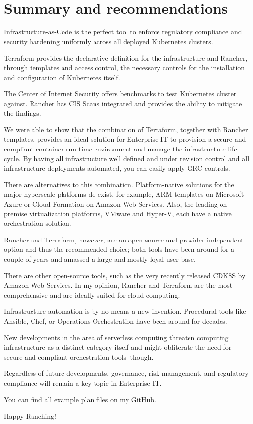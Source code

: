 %
%

\pagebreak
\section{Summary and recommendations}

\onehalfspacing

Infrastructure-as-Code is the perfect tool to enforce regulatory compliance and security hardening uniformly across all deployed Kubernetes clusters.

Terraform provides the declarative definition for the infrastructure and Rancher, through templates and access control, the necessary controls for the installation and configuration of Kubernetes itself.

The Center of Internet Security offers benchmarks to test Kubernetes cluster against. Rancher has CIS Scans integrated and provides the ability to mitigate the findings.

We were able to show that the combination of Terraform, together with Rancher templates, provides an ideal solution for Enterprise IT to provision a secure and compliant container run-time environment and manage the infrastructure life cycle. By having all infrastructure well defined and under revision control and all infrastructure deployments automated, you can easily apply GRC controls. 

There are alternatives to this combination. Platform-native solutions for the major hyperscale platforms do exist, for example, ARM templates on Microsoft Azure or Cloud Formation on Amazon Web Services. Also, the leading on-premise virtualization platforms, VMware and Hyper-V, each have a native orchestration solution.

Rancher and Terraform, however, are an open-source and provider-independent
option and thus the recommended choice; both tools have been around for a couple of years and amassed a large and mostly loyal user base.

There are other open-source tools, such as the very recently released CDK8S by Amazon Web Services. In my opinion, Rancher and Terraform are the most comprehensive and are ideally suited for cloud computing.

Infrastructure automation is by no means a new invention. Procedural tools like Ansible, Chef, or Operations Orchestration have been around for decades.

New developments in the area of serverless computing threaten computing infrastructure as a distinct category itself and might obliterate the need for secure and compliant orchestration tools, though.

Regardless of future developments, governance, risk management, and regulatory compliance will remain a key topic in Enterprise IT.

You can find all example plan files on my  \href{https://github.com/chfrank-cgn/Rancher/tree/master/az-cluster-1}{GitHub}.

Happy Ranching!
